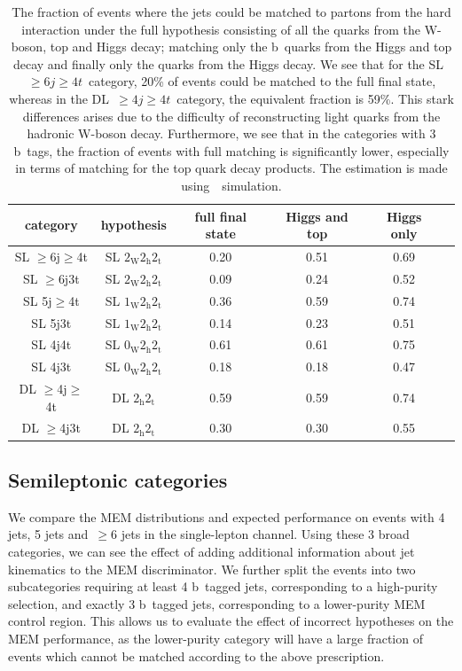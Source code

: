 \begin{table}[h!]
\begin{center}
\begin{tabular}{c|ccccc}
\hline
category & hypothesis & full final state & Higgs and top & Higgs only \\
\hline
SL $\geq$6j$\geq$4t & SL $2_{\mathrm{W}} 2_{\mathrm{h}} 2_{\mathrm{t}}$ & 0.20 & 0.51 & 0.69 \\
SL $\geq$6j3t & SL $2_{\mathrm{W}} 2_{\mathrm{h}} 2_{\mathrm{t}}$ & 0.09 & 0.24 & 0.52 \\
SL 5j$\geq$4t & SL $1_{\mathrm{W}} 2_{\mathrm{h}} 2_{\mathrm{t}}$ & 0.36 & 0.59 & 0.74 \\
SL 5j3t & SL $1_{\mathrm{W}} 2_{\mathrm{h}} 2_{\mathrm{t}}$  & 0.14 & 0.23 & 0.51 \\
SL 4j4t & SL $0_{\mathrm{W}} 2_{\mathrm{h}} 2_{\mathrm{t}}$ & 0.61 & 0.61 & 0.75 \\
SL 4j3t & SL $0_{\mathrm{W}} 2_{\mathrm{h}} 2_{\mathrm{t}}$  & 0.18 & 0.18 & 0.47 \\
\hline
DL $\geq$4j$\geq$4t & DL $2_{\mathrm{h}} 2_{\mathrm{t}}$ & 0.59 & 0.59 & 0.74 \\
DL $\geq$4j3t & DL $2_{\mathrm{h}} 2_{\mathrm{t}}$ & 0.30 & 0.30 & 0.55 \\
\hline
\hline
\end{tabular}
\caption[The fraction of matched events in the analysis categories]{The fraction of events where the jets could be matched to partons from the hard interaction under the full hypothesis consisting of all the quarks from the W-boson, top and Higgs decay; matching only the b~quarks from the Higgs and top decay and finally only the quarks from the Higgs decay. We see that for the SL~$\geq6j\geq4t$~category, 20\% of events could be matched to the full final state, whereas in the DL~$\geq4j\geq4t$~category, the equivalent fraction is 59\%. This stark differences arises due to the difficulty of reconstructing light quarks from the hadronic W-boson decay. Furthermore, we see that in the categories with 3 b~tags, the fraction of events with full matching is significantly lower, especially in terms of matching for the top quark decay products. The estimation is made using~\ttHbb~simulation.}
\end{center}
\label{tab:matching_fracs}
\end{table}

\subsection{Semileptonic categories}
We compare the MEM distributions and expected performance on events with 4 jets, 5 jets and~$\ge6$ jets in the single-lepton channel. Using these 3 broad categories, we can see the effect of adding additional information about jet kinematics to the MEM discriminator. We further split the events into two subcategories requiring at least 4 b~tagged jets, corresponding to a high-purity selection, and exactly 3 b~tagged jets, corresponding to a lower-purity MEM control region. This allows us to evaluate the effect of incorrect hypotheses on the MEM performance, as the lower-purity category will have a large fraction of events which cannot be matched according to the above prescription. 

